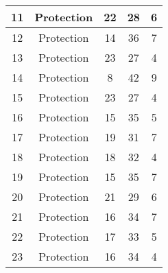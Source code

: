 \documentclass[results.tex]{subfiles}
\begin{document}
\begin{center}
\begin{tabular}{| c || c | c | c | c |}
            \hline
            11                      & Protection                   & 22                     & 28                      & 6                    \\
            \hline
            12                      & Protection                   & 14                     & 36                      & 7                    \\
            \hline
            13                      & Protection                   & 23                     & 27                      & 4                    \\
            \hline
            14                      & Protection                   & 8                      & 42                      & 9                    \\
            \hline
            15                      & Protection                   & 23                     & 27                      & 4                    \\
            \hline
            16                      & Protection                   & 15                     & 35                      & 5                    \\
            \hline
            17                      & Protection                   & 19                     & 31                      & 7                    \\
            \hline
            18                      & Protection                   & 18                     & 32                      & 4                    \\
            \hline
            19                      & Protection                   & 15                     & 35                      & 7                    \\
            \hline
            20                      & Protection                   & 21                     & 29                      & 6                    \\
            \hline
            21                      & Protection                   & 16                     & 34                      & 7                    \\
            \hline
            22                      & Protection                   & 17                     & 33                      & 5                    \\
            \hline
            23                      & Protection                   & 16                     & 34                      & 4                    \\

\end{tabular}
\end{center}
\end{document}
